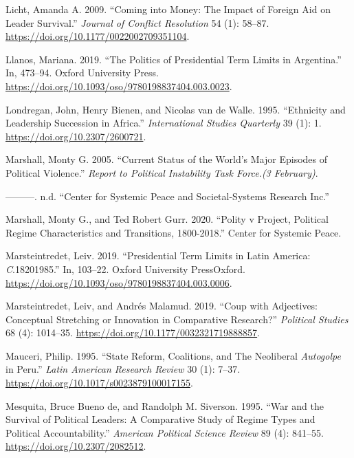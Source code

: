\documentclass[
  12pt,
]{report}
\newlength{\cslhangindent}
\newenvironment{CSLReferences}[2] %
 {\begin{list}{}{%
  \setlength{\itemindent}{0pt}
  \setlength{\leftmargin}{0pt}
  \setlength{\parsep}{0pt}
  \ifodd #1
   \setlength{\leftmargin}{\cslhangindent}
   \setlength{\itemindent}{-1\cslhangindent}
  \fi
  \setlength{\itemsep}{#2\baselineskip}}}
 {\end{list}}
\begin{document}
\begin{CSLReferences}{1}{0}
Licht, Amanda A. 2009. {``Coming into Money: The Impact of Foreign Aid
on Leader Survival.''} \emph{Journal of Conflict Resolution} 54 (1):
58--87. \url{https://doi.org/10.1177/0022002709351104}.

Llanos, Mariana. 2019. {``The Politics of Presidential Term Limits in
Argentina.''} In, 473--94. Oxford University Press.
\url{https://doi.org/10.1093/oso/9780198837404.003.0023}.

Londregan, John, Henry Bienen, and Nicolas van de Walle. 1995.
{``Ethnicity and Leadership Succession in Africa.''} \emph{International
Studies Quarterly} 39 (1): 1. \url{https://doi.org/10.2307/2600721}.

Marshall, Monty G. 2005. {``Current Status of the World's Major Episodes
of Political Violence.''} \emph{Report to Political Instability Task
Force.(3 February)}.

---------. n.d. {``Center for Systemic Peace and Societal-Systems
Research Inc.''}

Marshall, Monty G., and Ted Robert Gurr. 2020. {``Polity v Project,
Political Regime Characteristics and Transitions, 1800-2018.''} Center
for Systemic Peace.

Marsteintredet, Leiv. 2019. {``Presidential Term Limits in Latin
America: {\emph{C}}.1820{\textendash}1985.''} In, 103--22. Oxford
University PressOxford.
\url{https://doi.org/10.1093/oso/9780198837404.003.0006}.

Marsteintredet, Leiv, and Andrés Malamud. 2019. {``Coup with Adjectives:
Conceptual Stretching or Innovation in Comparative Research?''}
\emph{Political Studies} 68 (4): 1014--35.
\url{https://doi.org/10.1177/0032321719888857}.

Mauceri, Philip. 1995. {``State Reform, Coalitions, and The Neoliberal
{\emph{Autogolpe}} in Peru.''} \emph{Latin American Research Review} 30
(1): 7--37. \url{https://doi.org/10.1017/s0023879100017155}.

Mesquita, Bruce Bueno de, and Randolph M. Siverson. 1995. {``War and the
Survival of Political Leaders: A Comparative Study of Regime Types and
Political Accountability.''} \emph{American Political Science Review} 89
(4): 841--55. \url{https://doi.org/10.2307/2082512}.


\end{CSLReferences}
\end{document}
